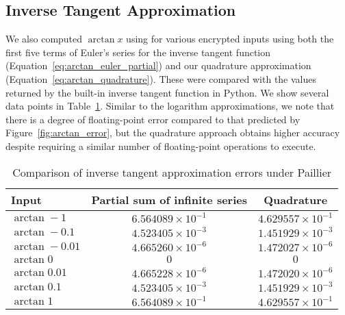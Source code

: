 \subsection{Inverse Tangent Approximation}
We also computed $\arctan x$ using for various encrypted inputs using both the first five terms of Euler's series for the inverse tangent function (Equation~\ref{eq:arctan_euler_partial}) and our quadrature approximation (Equation~\ref{eq:arctan_quadrature}). These were compared with the values returned by the built-in inverse tangent function in Python. We show several data points in Table~\ref{tab:arctan_approximation}. Similar to the logarithm approximations, we note that there is a degree of floating-point error compared to that predicted by Figure~\ref{fig:arctan_error}, but the quadrature approach obtains higher accuracy despite requiring a similar number of floating-point operations to execute.

\begin{table}[h]
	\caption{Comparison of inverse tangent approximation errors under Paillier}
	\label{tab:arctan_approximation}
	\begin{tabular}{lcc}
		\toprule
		Input & Partial sum of infinite series & Quadrature\\
		\midrule
		$\arctan -1$ & $6.564089 \times 10^{-1}$ & $4.629557 \times 10^{-1}$\\
		$\arctan -0.1$ & $4.523405 \times 10^{-3}$ & $1.451929 \times 10^{-3}$\\
		$\arctan -0.01$ & $4.665260 \times 10^{-6}$ & $1.472027 \times 10^{-6}$\\
		$\arctan 0$ & $0$ & $0$\\
		$\arctan 0.01$ & $4.665228 \times 10^{-6}$ & $1.472020 \times 10^{-6}$\\
		$\arctan 0.1$ & $4.523405 \times 10^{-3} $ & $1.451929 \times 10^{-3}$\\
		$\arctan 1$ & $6.564089 \times 10^{-1} $ & $4.629557 \times 10^{-1}$\\
	\bottomrule
\end{tabular}
\end{table}
